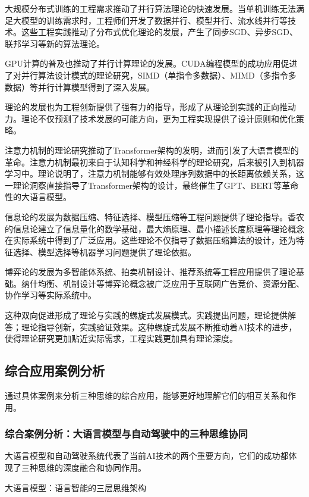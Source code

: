 大规模分布式训练的工程需求推动了并行算法理论的快速发展。当单机训练无法满足大模型的训练需求时，工程师们开发了数据并行、模型并行、流水线并行等技术。这些工程实践推动了分布式优化理论的发展，产生了同步SGD、异步SGD、联邦学习等新的算法理论。

GPU计算的普及也推动了并行计算理论的发展。CUDA编程模型的成功应用促进了对并行算法设计模式的理论研究，SIMD（单指令多数据）、MIMD（多指令多数据）等并行计算模型得到了深入发展。

理论的发展也为工程创新提供了强有力的指导，形成了从理论到实践的正向推动力。理论不仅预测了技术发展的可能方向，更为工程实现提供了设计原则和优化策略。

注意力机制的理论研究推动了Transformer架构的发明，进而引发了大语言模型的革命。注意力机制最初来自于认知科学和神经科学的理论研究，后来被引入到机器学习中。理论说明了，注意力机制能够有效处理序列数据中的长距离依赖关系，这一理论洞察直接指导了Transformer架构的设计，最终催生了GPT、BERT等革命性的大语言模型。

信息论的发展为数据压缩、特征选择、模型压缩等工程问题提供了理论指导。香农的信息论建立了信息量化的数学基础，最大熵原理、最小描述长度原理等理论概念在实际系统中得到了广泛应用。这些理论不仅指导了数据压缩算法的设计，还为特征选择、模型选择等机器学习问题提供了理论依据。

博弈论的发展为多智能体系统、拍卖机制设计、推荐系统等工程应用提供了理论基础。纳什均衡、机制设计等博弈论概念被广泛应用于互联网广告竞价、资源分配、协作学习等实际系统中。

这种双向促进形成了理论与实践的螺旋式发展模式。实践提出问题，理论提供解答；理论指导创新，实践验证效果。这种螺旋式发展不断推动着AI技术的进步，使得理论研究更加贴近实际需求，工程实践更加具有理论深度。

\subsection{综合应用案例分析}

通过具体案例来分析三种思维的综合应用，能够更好地理解它们的相互关系和作用。

\subsubsection{综合案例分析：大语言模型与自动驾驶中的三种思维协同}

大语言模型和自动驾驶系统代表了当前AI技术的两个重要方向，它们的成功都体现了三种思维的深度融合和协同作用。

大语言模型：语言智能的三层思维架构

